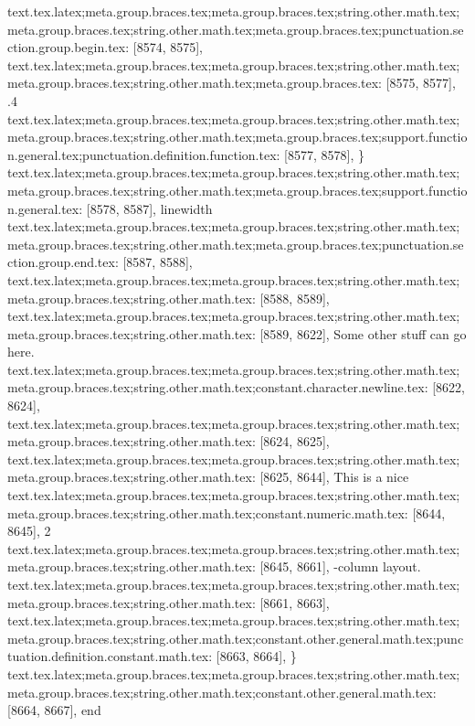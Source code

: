 {{{{{{{{{{{{{{{{{{{{{{{{{{{{{{{{{{{{{{{{{{{{{{{{{{{{{{{{{{{{{{{{{{{{{{{{{{{{{{{{{{{{{{{{{{{{{{{{{{{{{{{{{{{{{{{{{{{{{{{{{{{{{{{{{{{{{{{{{{{{{{{{{{{{{{{{{{{{{{{{{{{{{{{{{{{{{{{{{{{{{{{{{{{{{{{{{{{{{{{{{{{{{{{{{{{{{{{{{{{{{{{{{{{{{{{{{{{{{{{{{{{{{{{{{{text.tex.latex;meta.group.braces.tex;meta.group.braces.tex;string.other.math.tex;meta.group.braces.tex;string.other.math.tex;meta.group.braces.tex;punctuation.section.group.begin.tex: [8574, 8575], {{}
text.tex.latex;meta.group.braces.tex;meta.group.braces.tex;string.other.math.tex;meta.group.braces.tex;string.other.math.tex;meta.group.braces.tex: [8575, 8577], {.4}
text.tex.latex;meta.group.braces.tex;meta.group.braces.tex;string.other.math.tex;meta.group.braces.tex;string.other.math.tex;meta.group.braces.tex;support.function.general.tex;punctuation.definition.function.tex: [8577, 8578], {\}
text.tex.latex;meta.group.braces.tex;meta.group.braces.tex;string.other.math.tex;meta.group.braces.tex;string.other.math.tex;meta.group.braces.tex;support.function.general.tex: [8578, 8587], {linewidth}
text.tex.latex;meta.group.braces.tex;meta.group.braces.tex;string.other.math.tex;meta.group.braces.tex;string.other.math.tex;meta.group.braces.tex;punctuation.section.group.end.tex: [8587, 8588], {}}
text.tex.latex;meta.group.braces.tex;meta.group.braces.tex;string.other.math.tex;meta.group.braces.tex;string.other.math.tex: [8588, 8589], {
}
text.tex.latex;meta.group.braces.tex;meta.group.braces.tex;string.other.math.tex;meta.group.braces.tex;string.other.math.tex: [8589, 8622], {    Some other stuff can go here.}
text.tex.latex;meta.group.braces.tex;meta.group.braces.tex;string.other.math.tex;meta.group.braces.tex;string.other.math.tex;constant.character.newline.tex: [8622, 8624], {\\}
text.tex.latex;meta.group.braces.tex;meta.group.braces.tex;string.other.math.tex;meta.group.braces.tex;string.other.math.tex: [8624, 8625], {
}
text.tex.latex;meta.group.braces.tex;meta.group.braces.tex;string.other.math.tex;meta.group.braces.tex;string.other.math.tex: [8625, 8644], {    This is a nice }
text.tex.latex;meta.group.braces.tex;meta.group.braces.tex;string.other.math.tex;meta.group.braces.tex;string.other.math.tex;constant.numeric.math.tex: [8644, 8645], {2}
text.tex.latex;meta.group.braces.tex;meta.group.braces.tex;string.other.math.tex;meta.group.braces.tex;string.other.math.tex: [8645, 8661], {-column layout.
}
text.tex.latex;meta.group.braces.tex;meta.group.braces.tex;string.other.math.tex;meta.group.braces.tex;string.other.math.tex: [8661, 8663], {  }
text.tex.latex;meta.group.braces.tex;meta.group.braces.tex;string.other.math.tex;meta.group.braces.tex;string.other.math.tex;constant.other.general.math.tex;punctuation.definition.constant.math.tex: [8663, 8664], {\}
text.tex.latex;meta.group.braces.tex;meta.group.braces.tex;string.other.math.tex;meta.group.braces.tex;string.other.math.tex;constant.other.general.math.tex: [8664, 8667], {end}
}}}}}}}}}}}}}}}}}}}}}}}}}}}}}}}}}}}}}}}}}}}}}}}}}}}}}}}}}}}}}}}}}}}}}}}}}}}}}}}}}}}}}}}}}}}}}}}}}}}}}}}}}}}}}}}}}}}}}}}}}}}}}}}}}}}}}}}}}}}}}}}}}}}}}}}}}}}}}}}}}}}}}}}}}}}}}}}}}}}}}}}}}}}}}}}}}}}}}}}}}}}}}}}}}}}}}}}}}}}}}}}}}}}}}}}}}}}}}}}}}}}}}}}}}}}}

